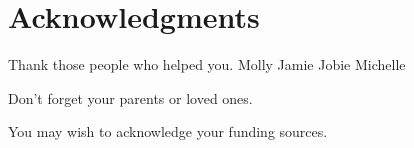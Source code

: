 
\chapter{Acknowledgments}

Thank those people who helped you. 
Molly
Jamie
Jobie
Michelle

Don't forget your parents or loved ones.

You may wish to acknowledge your funding sources.
